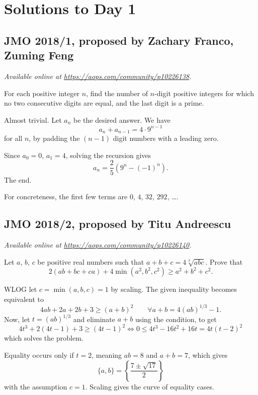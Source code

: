 \documentclass[11pt]{scrartcl}
\begin{document}
\section{Solutions to Day 1}
\subsection{JMO 2018/1, proposed by Zachary Franco, Zuming Feng}
\textsl{Available online at \url{https://aops.com/community/p10226138}.}
\begin{mdframed}[style=mdpurplebox,frametitle={Problem statement}]
For each positive integer $n$,
find the number of $n$-digit positive integers
for which no two consecutive digits are equal, and
the last digit is a prime.
\end{mdframed}
Almost trivial.
Let $a_n$ be the desired answer.
We have \[ a_n + a_{n-1} = 4 \cdot 9^{n-1} \]
for all $n$, by padding the $(n-1)$ digit numbers with a leading zero.

Since $a_0 = 0$, $a_1 = 4$, solving the recursion gives
\[ a_n = \frac 25 \left( 9^n - (-1)^n \right). \]
The end.

\begin{remark*}
  For concreteness,
  the first few terms are
  $0$, $4$, $32$, $292$, \dots.
\end{remark*}
\pagebreak

\subsection{JMO 2018/2, proposed by Titu Andreescu}
\textsl{Available online at \url{https://aops.com/community/p10226140}.}
\begin{mdframed}[style=mdpurplebox,frametitle={Problem statement}]
Let $a$, $b$, $c$ be positive real numbers such that $a+b+c = 4\sqrt[3]{abc}$.
Prove that
\[ 2(ab+bc+ca) + 4 \min (a^2, b^2, c^2) \ge a^2 + b^2 + c^2. \]
\end{mdframed}
WLOG let $c = \min(a,b,c) = 1$ by scaling.
The given inequality becomes equivalent to
\[ 4ab + 2a + 2b + 3 \ge (a+b)^2 \qquad \forall a+b = 4(ab)^{1/3}-1. \]
Now, let $t = (ab)^{1/3}$ and eliminate $a+b$ using the condition, to get
\[ 4t^3 + 2(4t-1) + 3 \ge (4t-1)^2
  \iff 0 \le 4t^3 - 16t^2 + 16t = 4t(t-2)^2 \]
which solves the problem.

Equality occurs only if $t=2$,
meaning $ab = 8$ and $a+b=7$, which gives
\[ \{a,b\} = \left\{ \frac{7 \pm \sqrt{17}}{2} \right\} \]
with the assumption $c = 1$.
Scaling gives the curve of equality cases.
\pagebreak
\end{document}
